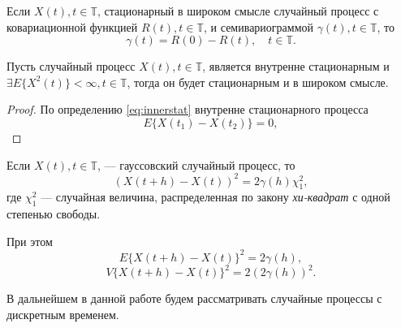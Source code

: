 \begin{Remark}
	Если $ X(t), t \in \mathbb{T} $, стационарный в широком смысле случайный процесс с ковариационной функцией $ R(t), t \in \mathbb{T} $, и семивариограммой $ \gamma(t), t \in \mathbb{T} $, то
	\begin{equation*}
		\gamma(t) = R(0) - R(t), \quad t \in \mathbb{T}.
	\end{equation*}
\end{Remark}

\begin{Theorem}
	Пусть случайный процесс $ X(t), t \in \mathbb{T} $, является внутренне стационарным и $ \exists E \{ X^2(t) \} < \infty, t \in \mathbb{T} $, тогда он будет стационарным и в широком смысле.
\end{Theorem}
\begin{proof}
	По определению \eqref{eq:innerstat} внутренне стационарного процесса
	\begin{equation}
		E \{ X(t_1) - X(t_2) \} = 0,
	\end{equation}
\end{proof}

\begin{Remark}
	Если $ X(t), t \in \mathbb{T} $, --- гауссовский случайный процесс, то
	\begin{equation*}
		( X(t + h) - X(t) )^2 = 2 \gamma(h)\chi_1^2,
	\end{equation*}
	где $\chi_1^2$ --- случайная величина, распределенная по закону \textit{хи-квадрат} с одной степенью свободы.
\end{Remark}

При этом
\begin{equation}
\label{eq:E_diff_inc}
	E \{ X(t + h) - X(t) \}^2 = 2 \gamma(h),
\end{equation}
\begin{equation}
\label{eq:V_diff_inc}
	V \{ X(t + h) - X(t) \}^2 = 2 (2 \gamma(h))^2.
\end{equation}

В дальнейшем в данной работе будем рассматривать случайные процессы с дискретным временем.